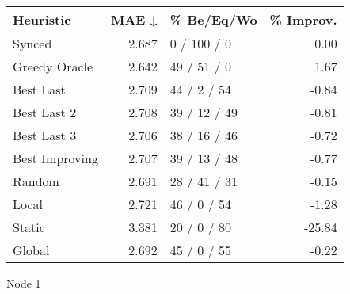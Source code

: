 \begin{tabular}{lrlr}
\toprule
\textbf{Heuristic} & \textbf{MAE ↓} & \textbf{\% Be/Eq/Wo} & \textbf{\% Improv.} \\
\midrule
            Synced &          2.687 &          0 / 100 / 0 &                0.00 \\
     Greedy Oracle &          2.642 &          49 / 51 / 0 &                1.67 \\
         Best Last &          2.709 &          44 / 2 / 54 &               -0.84 \\
       Best Last 2 &          2.708 &         39 / 12 / 49 &               -0.81 \\
       Best Last 3 &          2.706 &         38 / 16 / 46 &               -0.72 \\
    Best Improving &          2.707 &         39 / 13 / 48 &               -0.77 \\
            Random &          2.691 &         28 / 41 / 31 &               -0.15 \\
             Local &          2.721 &          46 / 0 / 54 &               -1.28 \\
            Static &          3.381 &          20 / 0 / 80 &              -25.84 \\
            Global &          2.692 &          45 / 0 / 55 &               -0.22 \\
\bottomrule
\end{tabular}
\caption{Node 1}
\label{tab:hr_iid_lr01_le2_bs2_1}
